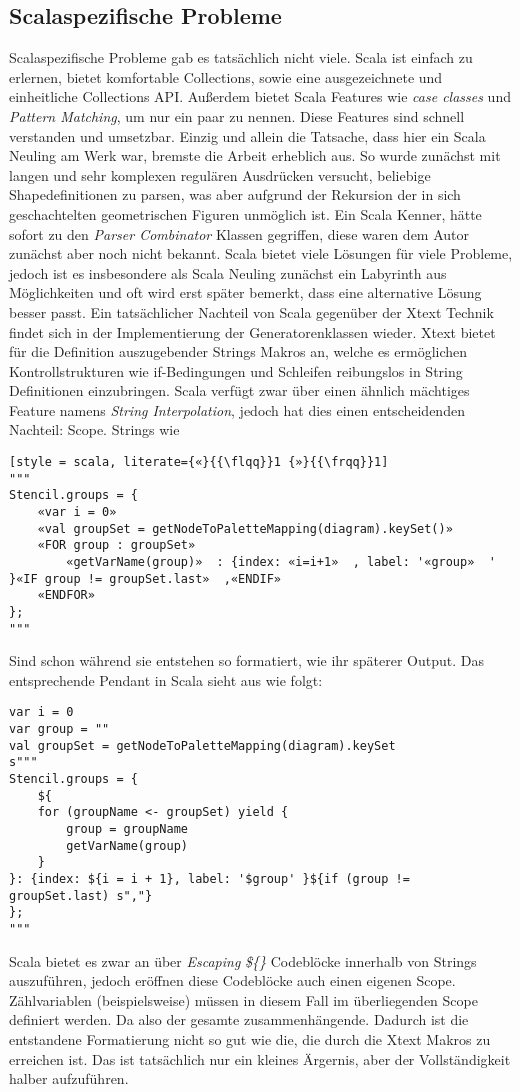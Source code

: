 \subsection{Scalaspezifische Probleme}
Scalaspezifische Probleme gab es tatsächlich nicht viele. Scala ist einfach zu erlernen, bietet komfortable Collections, sowie eine ausgezeichnete und einheitliche Collections API. Außerdem bietet Scala Features wie \textit{case classes} und \textit{Pattern Matching}, um nur ein paar zu nennen. Diese Features sind schnell verstanden und umsetzbar. Einzig und allein die Tatsache, dass hier ein Scala Neuling am Werk war, bremste die Arbeit erheblich aus. So wurde zunächst mit langen und sehr komplexen regulären Ausdrücken versucht, beliebige Shapedefinitionen zu parsen, was aber aufgrund der Rekursion der in sich geschachtelten geometrischen Figuren unmöglich ist. Ein Scala Kenner, hätte sofort zu den \textit{Parser Combinator} Klassen gegriffen, diese waren dem Autor zunächst aber noch nicht bekannt. Scala bietet viele Lösungen für viele Probleme, jedoch ist es insbesondere als Scala Neuling zunächst ein Labyrinth aus Möglichkeiten und oft wird erst später bemerkt, dass eine alternative Lösung besser passt. Ein tatsächlicher Nachteil von Scala gegenüber der Xtext Technik findet sich in der Implementierung der Generatorenklassen wieder. Xtext bietet für die Definition auszugebender Strings Makros an, welche es ermöglichen Kontrollstrukturen wie if-Bedingungen und Schleifen reibungslos in String Definitionen einzubringen. Scala verfügt zwar über einen ähnlich mächtiges Feature namens \textit{String Interpolation}, jedoch hat dies einen entscheidenden Nachteil: Scope. Strings wie
\begin{lstlisting}[style = scala, literate={«}{{\flqq}}1 {»}{{\frqq}}1]
"""
Stencil.groups = {
	«var i = 0»  
	«val groupSet = getNodeToPaletteMapping(diagram).keySet()»  
	«FOR group : groupSet»  
		«getVarName(group)»  : {index: «i=i+1»  , label: '«group»  ' }«IF group != groupSet.last»  ,«ENDIF»  
 	«ENDFOR»  
};
"""
\end{lstlisting}
Sind schon während sie entstehen so formatiert, wie ihr späterer Output. Das entsprechende Pendant in Scala sieht aus wie folgt:
\begin{lstlisting}[style = scala]
var i = 0
var group = ""
val groupSet = getNodeToPaletteMapping(diagram).keySet
s"""
Stencil.groups = {
	${
	for (groupName <- groupSet) yield {
		group = groupName
		getVarName(group)
	}
}: {index: ${i = i + 1}, label: '$group' }${if (group != groupSet.last) s","}
};
"""
\end{lstlisting}Scala bietet es zwar an über \textit{Escaping} \textit{\$\{\}} Codeblöcke innerhalb von Strings auszuführen, jedoch eröffnen diese Codeblöcke auch einen eigenen Scope. Zählvariablen (beispielsweise) müssen in diesem Fall im überliegenden Scope definiert werden. Da also der gesamte zusammenhängende. Dadurch ist die entstandene Formatierung nicht so gut wie die, die durch die Xtext Makros zu erreichen ist. Das ist tatsächlich nur ein kleines Ärgernis, aber der Vollständigkeit halber aufzuführen.

